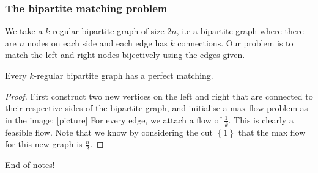 \documentclass[a4paper]{scrartcl}
\begin{document}
\subsubsection{The bipartite matching problem}
We take a $k$-regular bipartite graph of size $2n$, i.e a bipartite graph where there are $n$ nodes on each side and each edge has $k$ connections. Our problem is to match the left and right nodes bijectively using the edges given.
\begin{theorem}
	Every $k$-regular bipartite graph has a perfect matching.
\end{theorem}
\begin{proof}
	 First construct two new vertices on the left and right that are connected to their respective sides of the bipartite graph, and initialise a max-flow problem as in the image: [picture]
	 For every edge, we attach a flow of $\frac{1}{k}$. This is clearly a feasible flow. Note that we know by considering the cut $\left\{1\right\}$ that the max flow for this new graph is $\frac{n}{2}$. 
\end{proof}
\begin{remark}
	 End of notes!
\end{remark}
\end{document}
